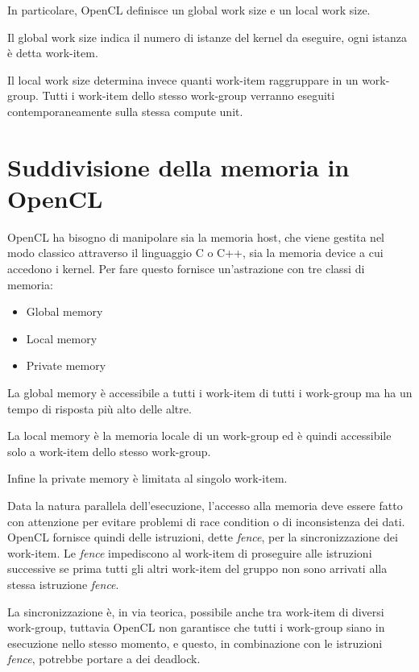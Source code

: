 In particolare, OpenCL definisce un global work size e un local work size.

Il global work size indica il numero di istanze del kernel da eseguire, ogni istanza è detta work-item.

Il local work size determina invece quanti work-item raggruppare in un work-group. Tutti i work-item dello stesso work-group verranno eseguiti contemporaneamente sulla stessa compute unit.

\section{Suddivisione della memoria in OpenCL}

OpenCL ha bisogno di manipolare sia la memoria host, che viene gestita nel modo classico attraverso il linguaggio C o C++, sia la memoria device a cui accedono i kernel. 
Per fare questo fornisce un'astrazione con tre classi di memoria:

\begin{itemize}
	\item Global memory
	\item Local memory
	\item Private memory
\end{itemize}

La global memory è accessibile a tutti i work-item di tutti i work-group ma ha un tempo di risposta più alto delle altre.

La local memory è la memoria locale di un work-group ed è quindi accessibile solo a work-item dello stesso work-group.

Infine la private memory è limitata al singolo work-item.

Data la natura parallela dell'esecuzione, l'accesso alla memoria deve essere fatto con attenzione per evitare problemi di race condition o di inconsistenza dei dati.
OpenCL fornisce quindi delle istruzioni, dette \textit{fence}, per la sincronizzazione dei work-item. Le \textit{fence} impediscono al work-item di proseguire alle istruzioni successive se prima tutti gli altri work-item del gruppo non sono arrivati alla stessa istruzione \textit{fence}.

La sincronizzazione è, in via teorica, possibile anche tra work-item di diversi work-group, tuttavia OpenCL non garantisce che tutti i work-group siano in esecuzione nello stesso momento, e questo, in combinazione con le istruzioni \textit{fence}, potrebbe portare a dei deadlock.

